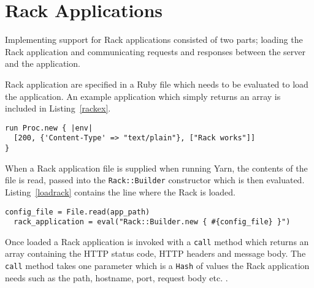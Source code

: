 \section{Rack Applications}
\label{rack}
Implementing support for Rack applications consisted of two parts; loading the
Rack application and communicating requests and responses between the server
and the application.

Rack application are specified in a Ruby file which needs to be evaluated to
load the application. An example application which simply returns
an array is included in Listing~\ref{rackex}.

\bigskip
\begin{lstlisting}[label=rackex,caption=Sample Rack application. (test\_objects/config.ru:4)]
run Proc.new { |env|
  [200, {'Content-Type' => "text/plain"}, ["Rack works"]]
}
\end{lstlisting}

When a Rack application file is supplied when running Yarn, the contents of
the file is read, passed into the \texttt{Rack::Builder} constructor which is
then evaluated. Listing~\ref{loadrack} contains the line where the Rack is
loaded.

\bigskip
\begin{lstlisting}[label=loadrack,caption=Loading a Rack application.
(lib/yarn/server.rb:31)]
  config_file = File.read(app_path)
  rack_application = eval("Rack::Builder.new { #{config_file} }")
\end{lstlisting}

Once loaded a Rack application is invoked with a \texttt{call} method which
returns an array containing the HTTP status code, HTTP headers and message
body. The \texttt{call} method takes one parameter which is a
\texttt{Hash} of values the Rack application needs such as the path, hostname,
port, request body etc. \cite{rackspec}. 




